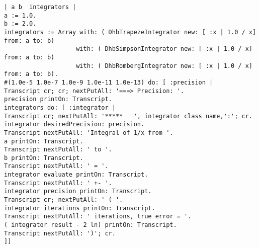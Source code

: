 \begin{verbatim}
| a b  integrators |
a := 1.0.
b := 2.0.
integrators := Array with: ( DhbTrapezeIntegrator new: [ :x | 1.0 / x] from: a to: b)
					with: ( DhbSimpsonIntegrator new: [ :x | 1.0 / x] from: a to: b)
					with: ( DhbRombergIntegrator new: [ :x | 1.0 / x] from: a to: b).
#(1.0e-5 1.0e-7 1.0e-9 1.0e-11 1.0e-13) do: [ :precision |
Transcript cr; cr; nextPutAll: '===> Precision: '.
precision printOn: Transcript.
integrators do: [ :integrator |
Transcript cr; nextPutAll: '*****   ', integrator class name,':'; cr.
integrator desiredPrecision: precision.
Transcript nextPutAll: 'Integral of 1/x from '.
a printOn: Transcript.
Transcript nextPutAll: ' to '.
b printOn: Transcript.
Transcript nextPutAll: ' = '.
integrator evaluate printOn: Transcript.
Transcript nextPutAll: ' +- '.
integrator precision printOn: Transcript.
Transcript cr; nextPutAll: ' ( '.
integrator iterations printOn: Transcript.
Transcript nextPutAll: ' iterations, true error = '.
( integrator result - 2 ln) printOn: Transcript.
Transcript nextPutAll: ')'; cr.
]]
\end{verbatim}
